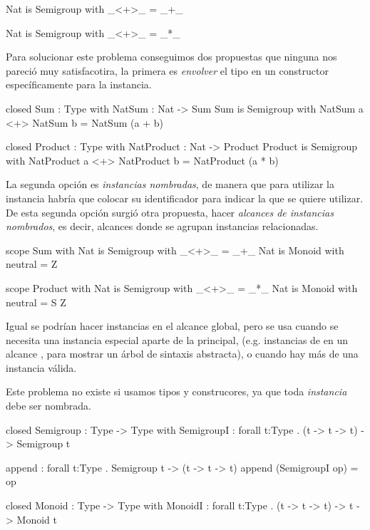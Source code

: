 {\begin{designfr}
\begin{anglercode}
Nat is Semigroup with
    _<+>_ = _+_

Nat is Semigroup with
    _<+>_ = _*_
\end{anglercode}

Para solucionar este problema conseguimos dos propuestas que ninguna nos pareció muy satisfacotira, la primera es \emph{envolver} el tipo en un constructor específicamente para la instancia.

\begin{anglercode}
closed Sum : Type with
    NatSum : Nat -> Sum
Sum is Semigroup with
    NatSum a <+> NatSum b = NatSum (a + b)

closed Product : Type with
    NatProduct : Nat -> Product
Product is Semigroup with
    NatProduct a <+> NatProduct b = NatProduct (a * b)
\end{anglercode}

La segunda opción es \emph{instancias nombradas}, de manera que para utilizar la instancia habría que colocar su identificador para indicar la que se quiere utilizar. De esta segunda opción surgió otra propuesta, hacer \emph{alcances de instancias nombrados}, es decir, alcances donde se agrupan instancias relacionadas.

\begin{anglercode}
scope Sum with
    Nat is Semigroup with
        _<+>_ = _+_
    Nat is Monoid with
        neutral = Z

scope Product with
    Nat is Semigroup with
        _<+>_ = _*_
    Nat is Monoid with
        neutral = S Z
\end{anglercode}

Igual se podrían hacer instancias en el alcance global, pero se usa cuando se necesita una instancia especial aparte de la principal, (e.g. instancias de  en un alcance , para mostrar un árbol de sintaxis abstracta), o cuando hay más de una instancia válida.

Este problema no existe si usamos tipos y construcores, ya que toda \emph{instancia} debe ser nombrada.

\begin{anglercode}
closed Semigroup : Type -> Type with
    SemigroupI : forall t:Type . (t -> t -> t) -> Semigroup t

append : forall t:Type . Semigroup t -> (t -> t -> t)
append (SemigroupI op) = op

closed Monoid : Type -> Type with
    MonoidI : forall t:Type . (t -> t -> t) -> t -> Monoid t


\end{anglercode}
\end{designfr}}
